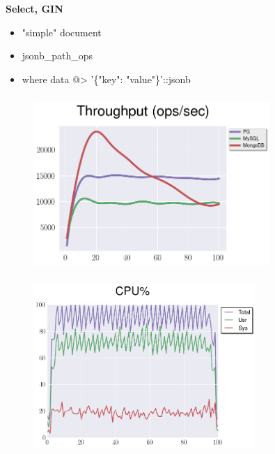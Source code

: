 \documentclass[usenames,dvipsnames, 18pt, compress, aspectratio=169]{beamer}
\begin{document}
\begin{frame}
    \frametitle{}
    \begin{center}
        \textbf{Select, GIN}
        \begin{itemize}[label={}]
            \item "simple" document
            \item jsonb\_path\_ops
            \item where data @> '\{"key": "value"\}'::jsonb
        \end{itemize}
    \end{center}
\end{frame}

\begin{frame}
    \frametitle{}
    \begin{center}
    \vspace{10pt}
    \begin{figure}
        \includegraphics[width=0.8\textwidth,center]{benchmarks/select_jsonb_path_ops_throughput.png}
    \end{figure}
    \end{center}
\end{frame}

\begin{frame}
    \frametitle{}
    \begin{center}
    \vspace{10pt}
    \begin{figure}
        \includegraphics[width=0.75\textwidth,center]{benchmarks/pg_select_cpu_20.png}
    \end{figure}
    \end{center}
\end{frame}
\end{document}
